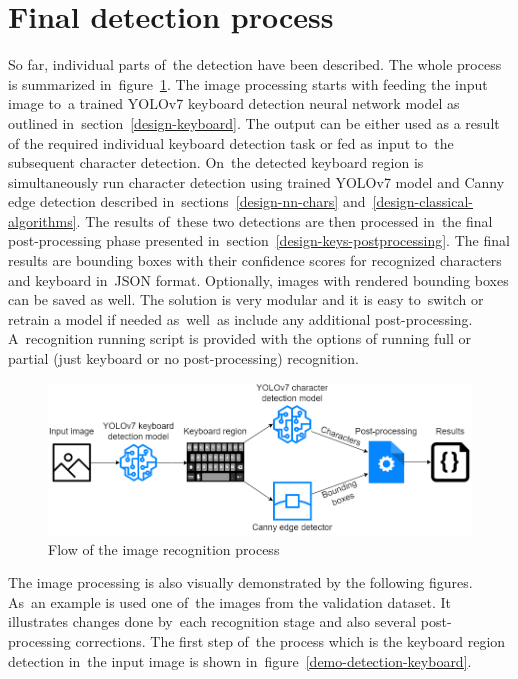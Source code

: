 \section{Final detection process}
\label{design-final-detection-process}
So far, individual parts of~the detection have been described. The whole process is summarized in~figure~\ref{detection-flow-chart}. The image processing starts with feeding the input image to~a trained YOLOv7 keyboard detection neural network model as outlined in~section~\ref{design-keyboard}. The output can be either used as a result of the required individual keyboard detection task or fed as input to~the subsequent character detection. On~the detected keyboard region is simultaneously run character detection using trained YOLOv7 model and Canny edge detection described in~sections~\ref{design-nn-chars} and~\ref{design-classical-algorithms}. The results of~these two detections are then processed in~the final post-processing phase presented in~section~\ref{design-keys-postprocessing}. The final results are bounding boxes with their confidence scores for recognized characters and keyboard in~JSON format. Optionally, images with rendered bounding boxes can be saved as well. The solution is very modular and it is easy to~switch or retrain a model if needed as~well~as include any additional post-processing. A~recognition running script is provided with the options of running full or partial (just keyboard or no post-processing) recognition.

\begin{figure}[hbt]
    \includegraphics[width=1\textwidth]{img/design/detection-flow-chart.png}
    \caption{Flow of the image recognition process}
    \label{detection-flow-chart}
\end{figure}

The image processing is also visually demonstrated by the following figures. As~an example is used one of~the images from the validation dataset. It illustrates changes done by~each recognition stage and also several post-processing corrections. The first step of~the process which is the keyboard region detection in~the input image is shown in~figure~\ref{demo-detection-keyboard}.

